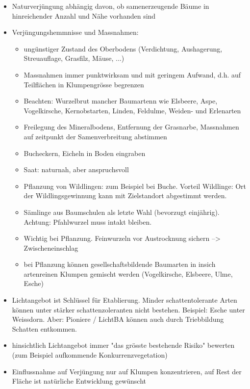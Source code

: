 \documentclass{article}
\begin{document}
\begin{itemize}
  \item Naturverjüngung abhängig davon, ob samenerzeugende Bäume in hinreichender Anzahl und Nähe vorhanden sind
  
  \item Verjüngungshemmnisse und Massnahmen:
  
    \begin{itemize}
       \item ungünstiger Zustand des Oberbodens (Verdichtung, Aushagerung, Streuauflage, Grasfilz, Mäuse, ...)
       \item Massnahmen immer punktwirksam und mit geringem Aufwand, d.h. auf Teilflächen in Klumpengrösse begrenzen
       \item Beachten: Wurzelbrut mancher Baumartenn wie Elsbeere, Aspe, Vogelkirsche, Kernobstarten, Linden, Feldulme, Weiden- und Erlenarten
       \item Freilegung des Mineralbodens, Entfernung der Grasnarbe, Massnahmen auf zeitpunkt der Samenverbreitung abstimmen
       \item Bucheckern, Eicheln in Boden eingraben
       \item Saat: naturnah, aber anspruchsvoll
       \item Pflanzung von Wildlingen: zum Beispiel bei Buche. Vorteil Wildlinge: Ort der Wildlingsgewinnung kann mit Zielstandort abgestimmt werden.
       \item Sämlinge aus Baumschulen als letzte Wahl (bevorzugt einjährig). Achtung: Pfahlwurzel muss intakt bleiben.
       \item Wichtig bei Pflanzung. Feinwurzeln vor Austrocknung sichern --> Zwischeneinschlag
       \item bei Pflanzung können gesellschaftsbildende Baumarten in insich artenreinen Klumpen gemischt werden (Vogelkirsche, Elsbeere, Ulme, Esche)
    \end{itemize}


   \item Lichtangebot ist Schlüssel für Etablierung. Minder schattentolerante Arten können unter stärker schattenzoleranten nicht bestehen. Beispiel: Esche unter Weissdorn. Aber: Pioniere / LichtBA können auch durch Triebbildung Schatten entkommen.
   
   \item hinsichtlich Lichtangebot immer "das grösste bestehende Risiko" bewerten (zum Beispiel aufkommende Konkurrenzvegetation)

   \item Einflussnahme auf Verjüngung nur auf Klumpen konzentrieren, auf Rest der Fläche ist natürliche Entwicklung gewünscht
   

\end{itemize}
\end{document}
